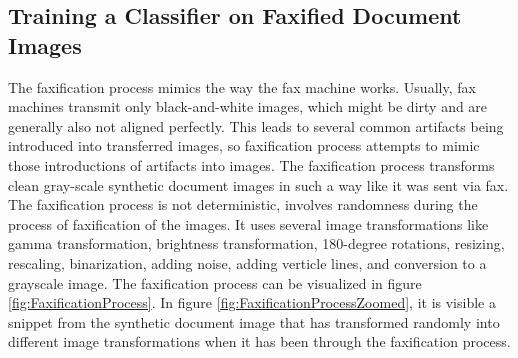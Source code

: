 \subsection{Training a Classifier on Faxified Document Images}\label{trainingfaxifiedclassifier}

The faxification process mimics the way the fax machine works. Usually, fax machines transmit only black-and-white images, which might be dirty and are generally also not aligned perfectly. This leads to several common artifacts being introduced into transferred images, so faxification process attempts to mimic those introductions of artifacts into images. The faxification process transforms clean gray-scale synthetic document images in such a way like it was sent via fax. The faxification process is not deterministic, involves randomness during the process of faxification of the images. It uses several image transformations like gamma transformation, brightness transformation, 180-degree rotations, resizing, rescaling, binarization, adding noise, adding verticle lines, and conversion to a grayscale image. The faxification process can be visualized in figure \ref{fig:FaxificationProcess}. In figure \ref{fig:FaxificationProcessZoomed}, it is visible a snippet from the synthetic document image that has transformed randomly into different image transformations when it has been through the faxification process.



